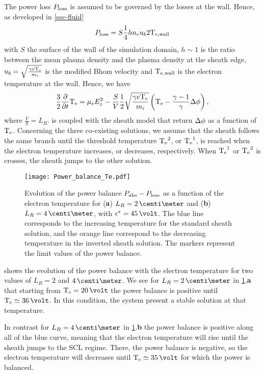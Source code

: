     The power loss $P_{\rm loss}$ is assumed to be governed by the losses at the wall.
    Hence, as developed in \cref{sec-fluid}
    \begin{equation} \label{eq-Ploss}
      P_{\rm loss} = S \frac{1}{4} h n_e u_b 2 \mathrm{T_{e, wall}}
    \end{equation}
    with $S$ the surface of the wall of the simulation domain, $h \sim 1$ is the ratio between the mean plasma density and the plasma density at the sheath edge, $u_b = \sqrt{\frac{\gamma e \mathrm{T_e}}{m_i}}$ is the modified Bhom velocity and $\mathrm{T_{e, wall}}$ is the electron temperature at the wall.
    Hence, we have
    \begin{equation} \label{eq-MG_bis}
    \frac{3}{2} \frac{\partial }{\partial t} \mathrm{T_e} = \mu_e  E_z^2 - \frac{S}{V} \frac{1}{2} \sqrt{\frac{\gamma e \mathrm{T_e}}{m_i}}  \left( \mathrm{T_e} - \frac{\gamma - 1}{\gamma} \Delta \phi \right),
    \end{equation}
    where $\frac{V}{S} = L_R$.
     is coupled with the sheath model that return $\Delta \phi$ as a function of $\mathrm{T_e}$.
    Concerning the three co-existing solutions, we assume that the sheath follows the same branch until the threshold temperature $\mathrm{T_e}^2$, or $\mathrm{T_e}^1$, is reached when the electron temperature increases, or decreases, respectively.
    When $\mathrm{T_e}^1$ or $\mathrm{T_e}^2$ is crosses, the sheath jumps to the other solution.
    
    
    \begin{figure}[!hbt]
      \centering
      \texttt{[image: Power\_balance\_Te.pdf]}
      \caption{Evolution of the power balance $P_{\rm abs}-P_{\rm loss}$ as a function of the electron temperature for ({\bf a}) $L_R=2\,\centi\meter$ and ({\bf b}) $L_R=4\,\centi\meter$, with $\crover=45\,\volt$. The blue line corresponds to the increasing temperature for the standard sheath solution, and the orange line correspond to the decreasing temperature in the inverted sheath solution. The markers represent the limit values of the power balance.}
      \label{fig-powerbalance}
    \end{figure}
    
     shows the evolution of the power balance with the electron temperature for two values of $L_R=2$ and $4\,\centi\meter$.
    We see for $L_R=2\,\centi\meter$ in \cref{fig-powerbalance}.{\bf a} that starting from $\Te=20\,\volt$ the power balance is positive until $\Te\simeq36\,\volt$.
    In this condition, the system present a stable solution at that temperature.
    
    In contrast for $L_R=4\,\centi\meter$ in \cref{fig-powerbalance}.{\bf b} the power balance is positive along all of the blue curve, meaning that the electron temperature will rise until the sheath jumps to the \ac{SCL} regime.
    There, the power balance is negative, so the electron temperature will decreases until $\Te\simeq35\,\volt$ for which the power is balanced.
    
